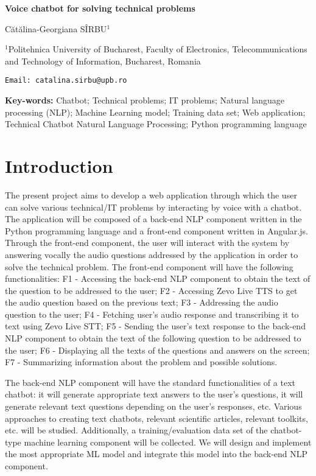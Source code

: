 \documentclass[12pt, twoside]{article}
\begin{document}
	\begin{center}
	\begin{huge}
	
	\textbf{Voice chatbot for solving technical problems}
	\end{huge}
	
	\begin{large}
		Cătălina-Georgiana SÎRBU$^1$
	\end{large}
	
	
	\small {$^1$Politehnica University of Bucharest, Faculty of Electronics, Telecommunications and Technology of Information, Bucharest, Romania}
	
	\texttt {Email: catalina.sirbu@upb.ro}
	
	\textbf{Key-words:} Chatbot; Technical problems; IT problems; Natural language processing (NLP); Machine Learning model; Training data set; Web application; Technical Chatbot Natural Language Processing; Python programming language

	\end{center}

\section{Introduction}

The present project aims to develop a web application through which the user can solve various technical/IT problems by interacting by voice with a chatbot. The application will be composed of a back-end NLP component written in the Python programming language and a front-end component written in Angular.js. Through the front-end component, the user will interact with the system by answering vocally the audio questions addressed by the application in order to solve the technical problem. The front-end component will have the following functionalities: F1 - Accessing the back-end NLP component to obtain the text of the question to be addressed to the user; F2 - Accessing Zevo Live TTS to get the audio question based on the previous text; F3 - Addressing the audio question to the user; F4 - Fetching user's audio response and transcribing it to text using Zevo Live STT; F5 - Sending the user's text response to the back-end NLP component to obtain the text of the following question to be addressed to the user; F6 - Displaying all the texts of the questions and answers on the screen; F7 - Summarizing information about the problem and possible solutions.

The back-end NLP component will have the standard functionalities of a text chatbot: it will generate appropriate text answers to the user's questions, it will generate relevant text questions depending on the user's responses, etc. Various approaches to creating text chatbots, relevant scientific articles, relevant toolkits, etc. will be studied. Additionally, a training/evaluation data set of the chatbot-type machine learning component will be collected. We will design and implement the most appropriate ML model and integrate this model into the back-end NLP component.
\end{document}
